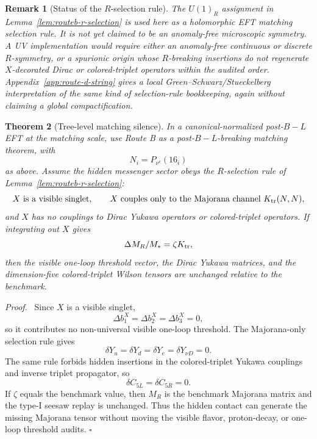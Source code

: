 \documentclass[
  aps,
  prd,
  preprint,
  nofootinbib,
  superscriptaddress,
  longbibliography
]{revtex4-2}
\newtheorem{theorem}{Theorem}[section]
\newtheorem{remark}[theorem]{Remark}
\newenvironment{proof}{\par\noindent\textit{Proof.}\ }{\hfill\(\square\)\par}
\begin{document}
\begin{remark}[Status of the \(R\)-selection rule]
The \(U(1)_R\) assignment in Lemma~\ref{lem:routeb-r-selection} is used here as
a holomorphic EFT matching selection rule.  It is not yet claimed to be an
anomaly-free microscopic symmetry.  A UV implementation would require either
an anomaly-free continuous or discrete \(R\)-symmetry, or a spurionic origin
whose \(R\)-breaking insertions do not regenerate \(X\)-decorated Dirac or
colored-triplet operators within the audited order.  Appendix~\ref{app:route-d-string}
gives a local Green--Schwarz/Stueckelberg interpretation of the same kind of
selection-rule bookkeeping, again without claiming a global compactification.
\end{remark}

\begin{theorem}[Tree-level matching silence]
In a canonical-normalized post-\(B-L\) EFT at the matching scale, use Route B
as a post-\(B-L\)-breaking matching theorem, with
\[
  N_i=P_{\nu^c}(16_i)
\]
as above.  Assume the hidden messenger sector obeys the \(R\)-selection rule of
Lemma~\ref{lem:routeb-r-selection}:
\[
  X\ \text{is a visible singlet},\qquad
  X\ \text{couples only to the Majorana channel }K_{\rm tr}(N,N),
\]
and \(X\) has no couplings to Dirac Yukawa operators or colored-triplet
operators.  If integrating out \(X\) gives
\[
  \Delta M_R/M_*=\zeta K_{\rm tr},
\]
then the visible one-loop threshold vector, the Dirac Yukawa matrices, and the
dimension-five colored-triplet Wilson tensors are unchanged relative to the
benchmark.
\end{theorem}

\begin{proof}
Since \(X\) is a visible singlet,
\[
  \Delta b_1^X=\Delta b_2^X=\Delta b_3^X=0,
\]
so it contributes no non-universal visible one-loop threshold.  The
Majorana-only selection rule gives
\[
  \delta Y_u=\delta Y_d=\delta Y_e=\delta Y_{\nu D}=0.
\]
The same rule forbids hidden insertions in the colored-triplet Yukawa
couplings and inverse triplet propagator, so
\[
  \delta C_{5L}=\delta C_{5R}=0.
\]
If \(\zeta\) equals the benchmark value, then \(M_R\) is the benchmark
Majorana matrix and the type-I seesaw replay is unchanged.  Thus the hidden
contact can generate the missing Majorana tensor without moving the visible
flavor, proton-decay, or one-loop threshold audits.
\end{proof}
\end{document}
